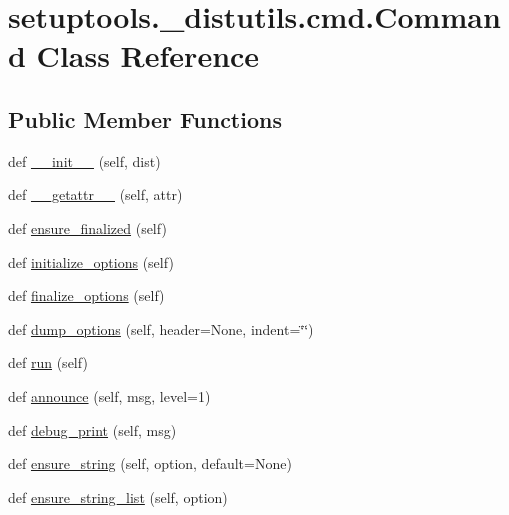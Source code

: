 \hypertarget{classsetuptools_1_1__distutils_1_1cmd_1_1Command}{}\section{setuptools.\+\_\+distutils.\+cmd.\+Command Class Reference}
\label{classsetuptools_1_1__distutils_1_1cmd_1_1Command}
\subsection*{Public Member Functions}
\begin{DoxyCompactItemize}
\item 
def \hyperlink{classsetuptools_1_1__distutils_1_1cmd_1_1Command_a8cdb4924d46154ac41da81fd78e8c295}{\+\_\+\+\_\+init\+\_\+\+\_\+} (self, dist)
\item 
def \hyperlink{classsetuptools_1_1__distutils_1_1cmd_1_1Command_ac02b3fe67d8ba1e73e86616204118bf9}{\+\_\+\+\_\+getattr\+\_\+\+\_\+} (self, attr)
\item 
def \hyperlink{classsetuptools_1_1__distutils_1_1cmd_1_1Command_a2d73742e3a0b9fca3e71a103b02941f6}{ensure\+\_\+finalized} (self)
\item 
def \hyperlink{classsetuptools_1_1__distutils_1_1cmd_1_1Command_abb96d70c357d435b22a1a9884337b1d4}{initialize\+\_\+options} (self)
\item 
def \hyperlink{classsetuptools_1_1__distutils_1_1cmd_1_1Command_a55932706ffef946f45869f80f6073c7f}{finalize\+\_\+options} (self)
\item 
def \hyperlink{classsetuptools_1_1__distutils_1_1cmd_1_1Command_a3e328bc55079ef34e3e9ef7bed5f10ca}{dump\+\_\+options} (self, header=None, indent=\char`\"{}\char`\"{})
\item 
def \hyperlink{classsetuptools_1_1__distutils_1_1cmd_1_1Command_aaf17daceac0b573a30f221bc4b2ffc59}{run} (self)
\item 
def \hyperlink{classsetuptools_1_1__distutils_1_1cmd_1_1Command_ab051d658feebbec119884df4a99be332}{announce} (self, msg, level=1)
\item 
def \hyperlink{classsetuptools_1_1__distutils_1_1cmd_1_1Command_ac12b68aa111c3baaf4599fb441227726}{debug\+\_\+print} (self, msg)
\item 
def \hyperlink{classsetuptools_1_1__distutils_1_1cmd_1_1Command_a1381279f963b951196d72f7eab9ac664}{ensure\+\_\+string} (self, option, default=None)
\item 
def \hyperlink{classsetuptools_1_1__distutils_1_1cmd_1_1Command_a8198211e71f6f065725ccc495af82379}{ensure\+\_\+string\+\_\+list} (self, option)

\end{DoxyCompactItemize}
